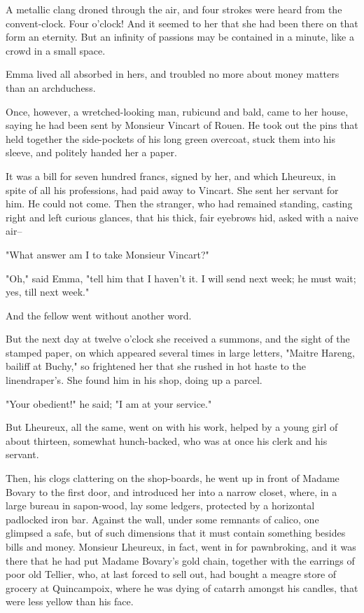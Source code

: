 \documentclass[11pt,twocolumn]{ltugboat}
\begin{document}
A metallic clang droned through the air, and four strokes were heard
from the convent-clock. Four o'clock! And it seemed to her that she had
been there on that form an eternity. But an infinity of passions may be
contained in a minute, like a crowd in a small space.

Emma lived all absorbed in hers, and troubled no more about money
matters than an archduchess.

Once, however, a wretched-looking man, rubicund and bald, came to her
house, saying he had been sent by Monsieur Vincart of Rouen. He took out
the pins that held together the side-pockets of his long green overcoat,
stuck them into his sleeve, and politely handed her a paper.

It was a bill for seven hundred francs, signed by her, and which
Lheureux, in spite of all his professions, had paid away to Vincart. She
sent her servant for him. He could not come. Then the stranger, who
had remained standing, casting right and left curious glances, that his
thick, fair eyebrows hid, asked with a naive air--

"What answer am I to take Monsieur Vincart?"

"Oh," said Emma, "tell him that I haven't it. I will send next week; he
must wait; yes, till next week."

And the fellow went without another word.

But the next day at twelve o'clock she received a summons, and the sight
of the stamped paper, on which appeared several times in large letters,
"Maitre Hareng, bailiff at Buchy," so frightened her that she rushed in
hot haste to the linendraper's. She found him in his shop, doing up a
parcel.

"Your obedient!" he said; "I am at your service."

But Lheureux, all the same, went on with his work, helped by a young
girl of about thirteen, somewhat hunch-backed, who was at once his clerk
and his servant.

Then, his clogs clattering on the shop-boards, he went up in front
of Madame Bovary to the first door, and introduced her into a narrow
closet, where, in a large bureau in sapon-wood, lay some ledgers,
protected by a horizontal padlocked iron bar. Against the wall, under
some remnants of calico, one glimpsed a safe, but of such dimensions
that it must contain something besides bills and money. Monsieur
Lheureux, in fact, went in for pawnbroking, and it was there that he had
put Madame Bovary's gold chain, together with the earrings of poor old
Tellier, who, at last forced to sell out, had bought a meagre store
of grocery at Quincampoix, where he was dying of catarrh amongst his
candles, that were less yellow than his face.
\end{document}
